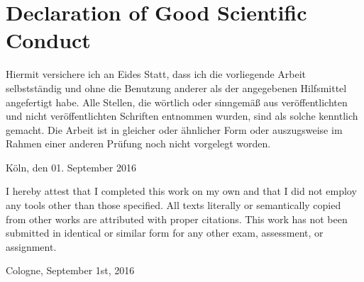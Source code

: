 \section*{Declaration of Good Scientific Conduct}

Hiermit versichere ich an Eides Statt, dass ich die vorliegende Arbeit selbstständig und ohne die Benutzung anderer als der angegebenen Hilfsmittel angefertigt habe. 
Alle Stellen, die wörtlich oder sinngemäß aus veröffentlichten und nicht veröffentlichten Schriften entnommen wurden, sind als solche kenntlich gemacht. 
Die Arbeit ist in gleicher oder ähnlicher Form oder auszugsweise im Rahmen einer anderen Prüfung noch nicht vorgelegt worden.
\vspace{15mm}
\begin{flushleft}
    Köln, den 01. September 2016
\end{flushleft}
\vspace{30mm}
I hereby attest that I completed this work on my own and that I did not employ any tools other than those specified. 
All texts literally or semantically copied from other works are attributed with proper citations. 
This work has not been submitted in identical or similar form for any other exam, assessment, or assignment.
\vspace{15mm}
\begin{flushleft}
    Cologne, September 1st, 2016
\end{flushleft}
	